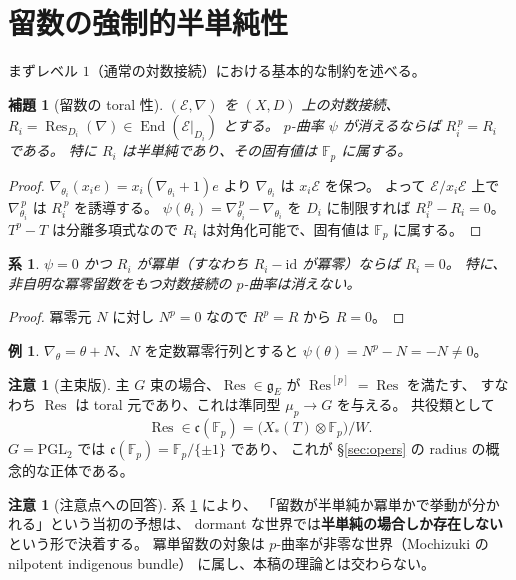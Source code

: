 \documentclass[a4paper,11pt]{ltjsarticle}
\theoremstyle{plain}
\newtheorem{lemma}[theorem]{補題}
\newtheorem{corollary}[theorem]{系}
\theoremstyle{definition}
\newtheorem{example}[theorem]{例}
\newtheorem{remark}[theorem]{注意}
\newcommand{\bbF}{\mathbb{F}}
\newcommand{\cE}{\mathcal{E}}
\newcommand{\fg}{\mathfrak{g}}
\newcommand{\Res}{\operatorname{Res}}
\newcommand{\End}{\operatorname{End}}
\begin{document}
\section{留数の強制的半単純性}\label{sec:residue}

まずレベル $1$（通常の対数接続）における基本的な制約を述べる。

\begin{lemma}[留数の toral 性]\label{lem:toral}
$(\cE,\nabla)$ を $(X,D)$ 上の対数接続、
$R_i=\Res_{D_i}(\nabla)\in\End(\cE|_{D_i})$ とする。
$p$-曲率 $\psi$ が消えるならば $R_i^{\,p}=R_i$ である。
特に $R_i$ は半単純であり、その固有値は $\bbF_p$ に属する。
\end{lemma}

\begin{proof}
$\nabla_{\theta_i}(x_ie)=x_i(\nabla_{\theta_i}+1)e$ より
$\nabla_{\theta_i}$ は $x_i\cE$ を保つ。
よって $\cE/x_i\cE$ 上で $\nabla_{\theta_i}^{\,p}$ は $R_i^{\,p}$ を誘導する。
$\psi(\theta_i)=\nabla_{\theta_i}^{\,p}-\nabla_{\theta_i}$ を $D_i$ に制限すれば
$R_i^{\,p}-R_i=0$。
$T^p-T$ は分離多項式なので $R_i$ は対角化可能で、固有値は $\bbF_p$ に属する。
\end{proof}

\begin{corollary}\label{cor:nilpotent}
$\psi=0$ かつ $R_i$ が冪単（すなわち $R_i-\mathrm{id}$ が冪零）ならば $R_i=0$。
特に、非自明な冪零留数をもつ対数接続の $p$-曲率は消えない。
\end{corollary}

\begin{proof}
冪零元 $N$ に対し $N^p=0$ なので $R^p=R$ から $R=0$。
\end{proof}

\begin{example}
$\nabla_\theta=\theta+N$、$N$ を定数冪零行列とすると
$\psi(\theta)=N^p-N=-N\neq0$。
\end{example}

\begin{remark}[主束版]
主 $G$ 束の場合、$\Res\in\fg_{E}$ が $\Res^{[p]}=\Res$ を満たす、
すなわち $\Res$ は toral 元であり、これは準同型 $\mu_p\to G$ を与える。
共役類として
\[
  \Res\in\mathfrak{c}(\bbF_p)=\bigl(X_*(T)\otimes\bbF_p\bigr)/W .
\]
$G=\mathrm{PGL}_2$ では $\mathfrak{c}(\bbF_p)=\bbF_p/\{\pm1\}$ であり、
これが \S\ref{sec:opers} の radius の概念的な正体である。
\end{remark}

\begin{remark}[注意点への回答]
系 \ref{cor:nilpotent} により、
「留数が半単純か冪単かで挙動が分かれる」という当初の予想は、
dormant な世界では\textbf{半単純の場合しか存在しない}という形で決着する。
冪単留数の対象は $p$-曲率が非零な世界（Mochizuki の nilpotent indigenous bundle）
に属し、本稿の理論とは交わらない。
\end{remark}
\end{document}
